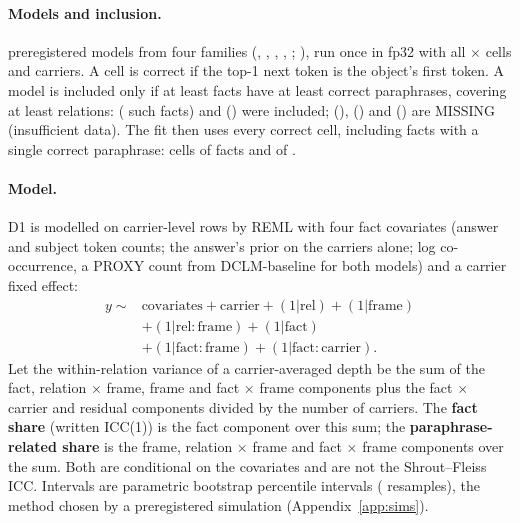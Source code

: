 \documentclass[11pt]{article}
\newcommand{\ICCone}{ICC(1)\xspace} %
\newcommand{\olmo}{\OlmoTwoSevenB}
\newcommand{\llama}{\LlamaThreeOneEightB}
\begin{document}
\paragraph{Models and inclusion.}
\ptNPreregModels{} preregistered models from four families (\QwenThreeEightB, \llama, \PythiaOneFourB, \PythiaTwoEightB, \olmo; \citealp{yang2025qwen3,grattafiori2024llama}), run once in fp32 with all \ptNFacts{} $\times$ \ptNFrames{} cells and \ptNcUsed{} carriers.
A cell is correct if the top-1 next token is the object's first token.
A model is included only if at least \ptRuleMinFacts{} facts have at least \ptRuleMinCorrect{} correct paraphrases, covering at least \ptRuleMinRel{} relations: \llama{} (\ptIncFactsLlama{} such facts) and \olmo{} (\ptIncFactsOlmo) were included; \QwenThreeEightB{} (\ptIncFactsQwen), \PythiaOneFourB{} (\ptIncFactsPyOneFour) and \PythiaTwoEightB{} (\ptIncFactsPyTwoEight) are MISSING (insufficient data).
The fit then uses every correct cell, including facts with a single correct paraphrase: \ptNCellsLlama{} cells of \ptNFactsLlama{} facts and \ptNCellsOlmo{} of \ptNFactsOlmo.
\paragraph{Model.}
D1 is modelled on carrier-level rows by REML with four fact covariates (answer and subject token counts; the answer's prior on the carriers alone; log co-occurrence, a PROXY count from DCLM-baseline \citep{li2024dclm} for both models) and a carrier fixed effect:
\begin{align*}
y \sim{}& \text{covariates} + \text{carrier} + (1|\text{rel}) + (1|\text{frame}) \\ %
&+ (1|\text{rel}{:}\text{frame}) + (1|\text{fact}) \\ %
&+ (1|\text{fact}{:}\text{frame}) + (1|\text{fact}{:}\text{carrier}). %
\end{align*}
Let the within-relation variance of a carrier-averaged depth be the sum of the fact, relation $\times$ frame, frame and fact $\times$ frame components plus the fact $\times$ carrier and residual components divided by the number of carriers.
The \textbf{fact share} (written \ICCone) is the fact component over this sum; the \textbf{paraphrase-related share} is the frame, relation $\times$ frame and fact $\times$ frame components over the sum.
Both are conditional on the covariates and are not the Shrout--Fleiss ICC.
Intervals are parametric bootstrap percentile intervals (\ptNBoot{} resamples), the method chosen by a preregistered simulation (Appendix~\ref{app:sims}).
\end{document}
